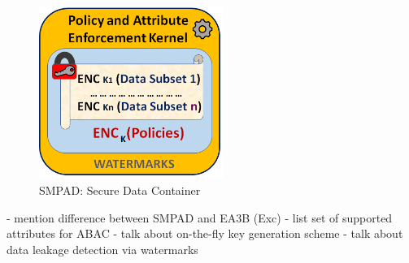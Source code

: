 \documentclass[conference]{IEEEtran}
\begin{document}
\begin{figure}[htbp]
\centering
\centerline{\includegraphics [width=6cm] {SMPAD-RelOK.png}}
\caption{SMPAD: Secure Data Container}
\label{fig}
\end{figure}

- mention difference between SMPAD and EA3B (Exc)
- list set of supported attributes for ABAC
- talk about on-the-fly key generation scheme
- talk about data leakage detection via watermarks

 
\end{document}
